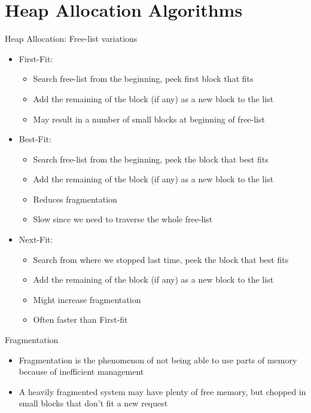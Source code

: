 \documentclass[
14pt,
aspectratio=169,
usenames,
dvipsnames,
x11names]{beamer}
\begin{document}
\section{Heap Allocation Algorithms}

\begin{frame}{Heap Allocation: Free-list variations }
  \begin{itemize}  \setlength{\itemsep}{\fill}
  \item \alert{First-Fit}:
    \begin{itemize}
    \item Search free-list from the beginning, peek first block that fits
    \item Add the remaining of the block (if any) as a new block to the list
    \item May result in a number of small blocks at beginning of free-list
    \end{itemize}
  \item \alert{Best-Fit}:
    \begin{itemize}
    \item Search free-list from the beginning, peek the block that best fits
    \item Add the remaining of the block (if any) as a new block to the list
    \item Reduces fragmentation
    \item Slow since we need to traverse the whole free-list
    \end{itemize}
  \item \alert{Next-Fit}:
    \begin{itemize}
    \item Search from where we stopped last time, peek the block that best fits
    \item Add the remaining of the block (if any) as a new block to the list
    \item Might increase fragmentation
    \item Often faster than First-fit
    \end{itemize}
  \end{itemize}
\end{frame}

\begin{frame}{Fragmentation}
  \begin{itemize}  \setlength{\itemsep}{\fill}
  \item Fragmentation is the phenomenon of \alert{not being able to use parts of memory} because of inefficient management
  \item A \alert{heavily fragmented} system may have \alert{plenty of free memory}, but chopped in small blocks that \alert{don't fit} a new request
  \end{itemize}
\end{frame}
\end{document}
